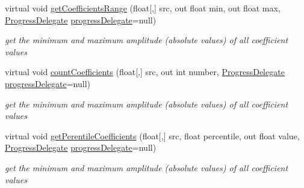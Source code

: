 \begin{DoxyCompactItemize}
virtual void \hyperlink{class_turbo_wavelets_1_1_wavelet2_d_ad25227565f3b5e5953e951ad5b375654}{get\+Coefficients\+Range} (float\mbox{[},\mbox{]} src, out float min, out float max, \hyperlink{class_turbo_wavelets_1_1_wavelet2_d_aec52fe74aa08e073119064ef4ac3fe93}{Progress\+Delegate} \hyperlink{class_turbo_wavelets_1_1_wavelet2_d_a41d9135f22a6b2cb661b2cc2ccb768ff}{progress\+Delegate}=null)
\begin{DoxyCompactList}\small\item\em get the minimum and maximum amplitude (absolute values) of all coefficient values \end{DoxyCompactList}\item 
virtual void \hyperlink{class_turbo_wavelets_1_1_wavelet2_d_aa4fffa151ff8bcf82d72fbd06c2253c8}{count\+Coefficients} (float\mbox{[},\mbox{]} src, out int number, \hyperlink{class_turbo_wavelets_1_1_wavelet2_d_aec52fe74aa08e073119064ef4ac3fe93}{Progress\+Delegate} \hyperlink{class_turbo_wavelets_1_1_wavelet2_d_a41d9135f22a6b2cb661b2cc2ccb768ff}{progress\+Delegate}=null)
\begin{DoxyCompactList}\small\item\em get the minimum and maximum amplitude (absolute values) of all coefficient values \end{DoxyCompactList}\item 
virtual void \hyperlink{class_turbo_wavelets_1_1_wavelet2_d_aded287c31752b4f3a7ad42ee3d273d3a}{get\+Perentile\+Coefficients} (float\mbox{[},\mbox{]} src, float percentile, out float value, \hyperlink{class_turbo_wavelets_1_1_wavelet2_d_aec52fe74aa08e073119064ef4ac3fe93}{Progress\+Delegate} \hyperlink{class_turbo_wavelets_1_1_wavelet2_d_a41d9135f22a6b2cb661b2cc2ccb768ff}{progress\+Delegate}=null)
\begin{DoxyCompactList}\small\item\em get the minimum and maximum amplitude (absolute values) of all coefficient values \end{DoxyCompactList}\end{DoxyCompactItemize}
